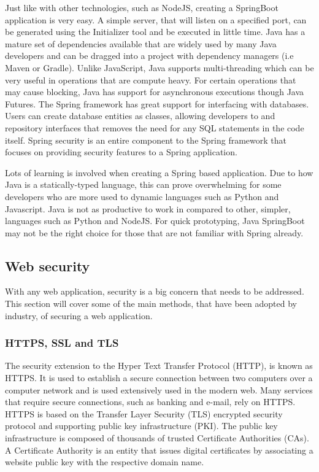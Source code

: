 Just like with other technologies, such as NodeJS, creating a SpringBoot application is very easy. 
A simple server, that will listen on a specified port, can be generated using the Initializer tool and be executed in little time.
Java has a mature set of dependencies available that are widely used by many Java developers and can be dragged into a project with
dependency managers (i.e Maven or Gradle).
Unlike JavaScript, Java supports multi-threading which can be very useful in operations that are compute heavy.
For certain operations that may cause blocking, Java has support for asynchronous executions though Java Futures.
The Spring framework has great support for interfacing with databases.
Users can create database entities as classes, allowing developers to and repository interfaces that removes the need for any SQL statements in the code itself.
Spring security is an entire component to the Spring framework that focuses on providing security features to a Spring application.

Lots of learning is involved when creating a Spring based application.
Due to how Java is a statically-typed language, this can prove overwhelming for some developers who are more used to dynamic languages 
such as Python and Javascript.
Java is not as productive to work in compared to other, simpler, languages such as Python and NodeJS.
For quick prototyping, Java SpringBoot may not be the right choice for those that are not familiar with Spring already.

\subsection{Web security}
With any web application, security is a big concern that needs to be addressed.
This section will cover some of the main methods, that have been adopted by industry, of securing a web application.

\subsubsection{HTTPS, SSL and TLS}
The security extension to the Hyper Text Transfer Protocol (HTTP), is known as HTTPS.
It is used to establish a secure connection between two computers over a computer network and is used extensively used in the modern web.
Many services that require secure connections, such as banking and e-mail, rely on HTTPS.
HTTPS is based on the Transfer Layer Security (TLS) encrypted security protocol and supporting public key infrastructure (PKI).
The public key infrastructure is composed of thousands of trusted Certificate Authorities (CAs).
A Certificate Authority is an entity that issues digital certificates by associating a website public key with the respective domain name.

